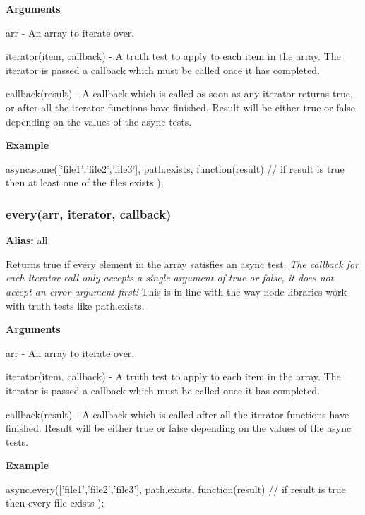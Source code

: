 {\bfseries Arguments}


\begin{DoxyItemize}
\item arr -\/ An array to iterate over.
\item iterator(item, callback) -\/ A truth test to apply to each item in the array. The iterator is passed a callback which must be called once it has completed.
\item callback(result) -\/ A callback which is called as soon as any iterator returns true, or after all the iterator functions have finished. Result will be either true or false depending on the values of the async tests.
\end{DoxyItemize}

{\bfseries Example} \begin{DoxyVerb}async.some(['file1','file2','file3'], path.exists, function(result){
    // if result is true then at least one of the files exists
});
\end{DoxyVerb}






\label{_every}%
 \subsubsection*{every(arr, iterator, callback)}

{\bfseries Alias\+:} all

Returns true if every element in the array satisfies an async test. {\itshape The callback for each iterator call only accepts a single argument of true or false, it does not accept an error argument first!} This is in-\/line with the way node libraries work with truth tests like path.\+exists.

{\bfseries Arguments}


\begin{DoxyItemize}
\item arr -\/ An array to iterate over.
\item iterator(item, callback) -\/ A truth test to apply to each item in the array. The iterator is passed a callback which must be called once it has completed.
\item callback(result) -\/ A callback which is called after all the iterator functions have finished. Result will be either true or false depending on the values of the async tests.
\end{DoxyItemize}

{\bfseries Example} \begin{DoxyVerb}async.every(['file1','file2','file3'], path.exists, function(result){
    // if result is true then every file exists
});
\end{DoxyVerb}







